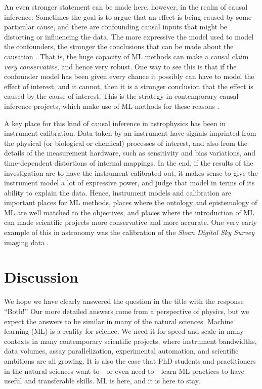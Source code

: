 \documentclass{article}
\begin{document}
An even stronger statement can be made here, however, in the realm of causal inference:
Sometimes the goal is to argue that an effect is being caused by some particular cause, and there are confounding causal inputs that might be distorting or influencing the data.
The more expressive the model used to model the confounders, the stronger the conclusions that can be made about the causation \cite{causal_inference}.
That is, the huge capacity of ML methods can make a causal claim \emph{very conservative}, and hence very robust.
One way to see this is that if the confounder model has been given every chance it possibly can have to model the effect of interest, and it cannot, then it is a stronger conclusion that the effect is caused by the cause of interest.
This is the strategy in contemporary causal-inference projects, which make use of ML methods for these reasons \cite{bart}.

A key place for this kind of causal inference in astrophysics has been in instrument calibration.
Data taken by an instrument have signals imprinted from the physical (or biological or chemical) processes of interest, and also from the details of the measurement hardware, such as sensitivity and bias variations, and time-dependent distortions of internal mappings.
In the end, if the results of the investigation are to have the instrument calibrated out, it makes sense to give the instrument model a lot of expressive power, and judge that model in terms of its ability to explain the data.
Hence, instrument models and calibration are important places for ML methods, places where the ontology and epistemology of ML are well matched to the objectives, and places where the introduction of ML can made scientific projects more conservative and more accurate.
One very early example of this in astronomy was the calibration of the \textsl{Sloan Digital Sky Survey} imaging data \cite{ubercalibration}.

\section{Discussion}\label{sec:discussion}

We hope we have clearly answered the question in the title with the response ``Both!''
Our more detailed answers come from a perspective of physics, but we expect the answers to be similar in many of the natural sciences.
Machine learning (ML) is a reality for science:
We need it for speed and scale in many contexts in many contemporary scientific projects, where instrument bandwidths, data volumes, assay parallelization, experimental automation, and scientific ambitions are all growing.
It is also the case that PhD students and practitioners in the natural sciences want to---or even need to---learn ML practices to have useful and transferable skills.
ML is here, and it is here to stay.
\end{document}
